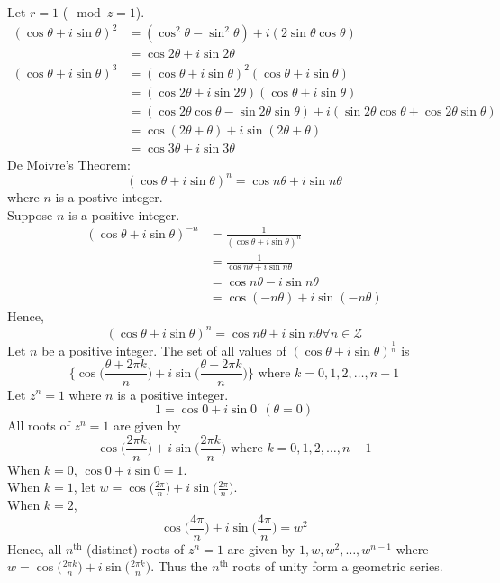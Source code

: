 \documentclass[12pt]{article}
\begin{document}
Let $r = 1$ ($\mod{z} = 1$). $$\begin{aligned} (\cos\theta + i\sin\theta)^2 &= (\cos^2\theta - \sin^2\theta) + i(2\sin\theta\cos\theta) \\ &= \cos2\theta + i\sin2\theta \\ (\cos\theta + i\sin\theta)^3 &= (\cos\theta + i\sin\theta)^2(\cos\theta + i\sin\theta) \\ &= (\cos2\theta + i\sin2\theta)(\cos\theta + i\sin\theta) \\ &= (\cos2\theta\cos\theta - \sin2\theta\sin\theta) + i(\sin2\theta\cos\theta + \cos2\theta\sin\theta) \\ &= \cos(2\theta + \theta) + i\sin(2\theta + \theta) \\ &= \cos3\theta + i\sin3\theta \end{aligned} $$ 
De Moivre's Theorem: $$ (\cos\theta + i\sin\theta)^n = \cos n\theta + i\sin n\theta $$ where $n$ is a postive integer. \\
Suppose $n$ is a positive integer. $$ \begin{aligned} (\cos\theta + i\sin\theta)^{-n} &= \frac{1}{(\cos\theta + i\sin\theta)^n} \\ &= \frac{1}{\cos n\theta + i\sin n\theta} \\ &= \cos n\theta - i\sin n\theta \\ &= \cos (-n\theta) + i\sin(-n\theta) \end{aligned} $$ 
Hence, $$ (\cos\theta + i\sin\theta)^n = \cos n\theta + i\sin n\theta \forall n \in \mathcal{Z}$$ 
Let $n$ be a positive integer. The set of all values of $(\cos\theta + i\sin\theta)^{\frac{1}{n}}$ is $$ \Big\{ \cos\Big( \frac{\theta + 2\pi k}{n} \Big) + i\sin\Big( \frac{\theta + 2\pi k}{n} \Big) \Big\} \text{ where } k = 0, 1, 2, \dots, n-1 $$ 
Let $z^n = 1$ where $n$ is a positive integer. $$ 1 = \cos 0 + i\sin 0 ~~ (\theta = 0) $$
All roots of $z^n = 1$ are given by $$ \cos \Big( \frac{2\pi k}{n} \Big) + i\sin \Big( \frac{2\pi k}{n} \Big) \text{ where } k = 0, 1, 2, \dots, n-1$$ 
When $k=0$, $\cos 0 + i\sin 0 = 1$. \\
When $k=1$, let $w = \cos \Big( \frac{2\pi}{n} \Big) + i\sin \Big(\frac{2\pi}{n} \Big)$. \\
When $k=2$, $$ \cos\Big( \frac{4\pi}{n} \Big) + i\sin\Big( \frac{4\pi}{n} \Big) = w^2$$ 
Hence, all $n^{\text{th}}$ (distinct) roots of $z^n = 1$ are given by $1,w,w^2,\dots,w^{n-1}$ where $w = \cos\Big( \frac{2\pi k}{n} \Big) + i\sin\Big( \frac{2\pi k}{n}\Big)$. Thus the $n^{\text{th}}$ roots of unity form a geometric series. \\~\\
\end{document}
